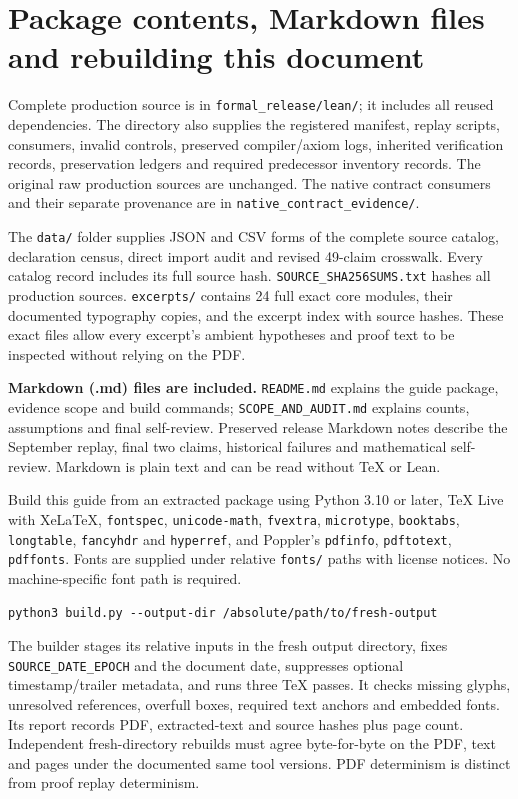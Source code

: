 \documentclass[11pt]{article}
\newcommand{\code}[1]{\nolinkurl{#1}}
\begin{document}
\section{Package contents, Markdown files and rebuilding this document}
Complete production source is in \code{formal_release/lean/}; it includes all reused dependencies. The directory also supplies the registered manifest, replay scripts, consumers, invalid controls, preserved compiler/axiom logs, inherited verification records, preservation ledgers and required predecessor inventory records. The original raw production sources are unchanged. The native contract consumers and their separate provenance are in \code{native_contract_evidence/}.

The \code{data/} folder supplies JSON and CSV forms of the complete source catalog, declaration census, direct import audit and revised 49-claim crosswalk. Every catalog record includes its full source hash. \code{SOURCE_SHA256SUMS.txt} hashes all production sources. \code{excerpts/} contains 24 full exact core modules, their documented typography copies, and the excerpt index with source hashes. These exact files allow every excerpt's ambient hypotheses and proof text to be inspected without relying on the PDF.

\textbf{Markdown (.md) files are included.} \code{README.md} explains the guide package, evidence scope and build commands; \code{SCOPE_AND_AUDIT.md} explains counts, assumptions and final self-review. Preserved release Markdown notes describe the September replay, final two claims, historical failures and mathematical self-review. Markdown is plain text and can be read without TeX or Lean.

Build this guide from an extracted package using Python 3.10 or later, TeX Live with XeLaTeX, \code{fontspec}, \code{unicode-math}, \code{fvextra}, \code{microtype}, \code{booktabs}, \code{longtable}, \code{fancyhdr} and \code{hyperref}, and Poppler's \code{pdfinfo}, \code{pdftotext}, \code{pdffonts}. Fonts are supplied under relative \code{fonts/} paths with license notices. No machine-specific font path is required.
\begin{Verbatim}[fontsize=\small,frame=lines]
python3 build.py --output-dir /absolute/path/to/fresh-output
\end{Verbatim}
The builder stages its relative inputs in the fresh output directory, fixes \code{SOURCE_DATE_EPOCH} and the document date, suppresses optional timestamp/trailer metadata, and runs three TeX passes. It checks missing glyphs, unresolved references, overfull boxes, required text anchors and embedded fonts. Its report records PDF, extracted-text and source hashes plus page count. Independent fresh-directory rebuilds must agree byte-for-byte on the PDF, text and pages under the documented same tool versions. PDF determinism is distinct from proof replay determinism.
\end{document}
